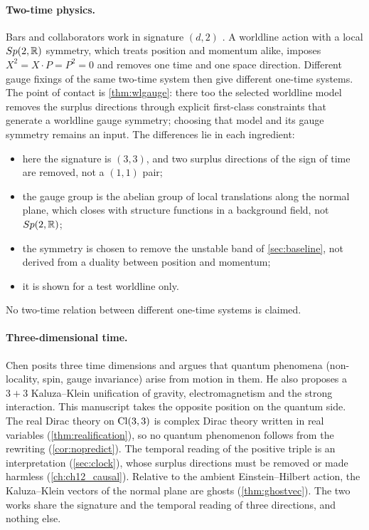 \paragraph{Two-time physics.} Bars and collaborators work in signature $(d,2)$ \cite{BarsDelidumanAndreev98,Bars01}. A worldline action with
a local $Sp(2,\mathbb{R})$ symmetry, which treats position and momentum alike, imposes $X^2=X\cdot P=P^2=0$ and removes one time and one space
direction. Different gauge fixings of the same two-time system then give different one-time systems. The point of contact is
\cref{thm:wlgauge}: there too the selected worldline model removes the surplus directions through explicit first-class constraints that generate a worldline
gauge symmetry; choosing that model and its gauge symmetry remains an input. The differences lie in each ingredient:
\begin{itemize}
\item here the signature is $(3,3)$, and two surplus directions of the sign of time are removed, not a $(1,1)$ pair;
\item the gauge group is the abelian group of local translations along the normal plane, which closes with structure functions in a
background field, not $Sp(2,\mathbb{R})$;
\item the symmetry is chosen to remove the unstable band of \cref{sec:baseline}, not derived from a duality between position and momentum;
\item it is shown for a test worldline only.
\end{itemize}
No two-time relation between different one-time systems is claimed.

\paragraph{Three-dimensional time.} Chen \cite{Chen05} posits three time dimensions and argues that quantum phenomena (non-locality, spin,
gauge invariance) arise from motion in them. He also proposes a $3+3$ Kaluza--Klein unification of gravity, electromagnetism and the strong
interaction. This manuscript takes the opposite position on the quantum side. The real Dirac theory on $\mathrm{Cl}(3,3)$ is complex Dirac theory
written in real variables (\cref{thm:realification}), so no quantum phenomenon follows from the rewriting (\cref{cor:nopredict}). The
temporal reading of the positive triple is an interpretation (\cref{sec:clock}), whose surplus directions must be removed or made harmless
(\cref{ch:ch12_causal}). Relative to the ambient Einstein--Hilbert action, the Kaluza--Klein vectors of the normal plane are ghosts (\cref{thm:ghostvec}). The two works share the signature and
the temporal reading of three directions, and nothing else.

